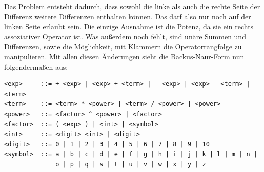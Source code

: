\documentclass[11pt]{article}
\begin{document}
Das Problem entsteht dadurch, dass sowohl die linke als auch 
die rechte Seite der Differenz weitere Differenzen enthalten können. 
Das darf also nur noch auf der linken Seite erlaubt sein. 
Die einzige Ausnahme ist die Potenz, da sie ein rechts assoziativer Operator ist. 
Was außerdem noch fehlt, sind unäre Summen und Differenzen, 
sowie die Möglichkeit, mit Klammern die Operatorrangfolge zu manipulieren. 
Mit allen diesen Änderungen sieht die Backus-Naur-Form nun folgendermaßen aus:

\begin{verbatim}
<exp>     ::= + <exp> | <exp> + <term> | - <exp> | <exp> - <term> | <term> 
<term>    ::= <term> * <power> | <term> / <power> | <power>
<power>   ::= <factor> ^ <power> | <factor>
<factor>  ::= ( <exp> ) | <int> | <symbol> 
<int>     ::= <digit> <int> | <digit>
<digit>   ::= 0 | 1 | 2 | 3 | 4 | 5 | 6 | 7 | 8 | 9 | 10
<symbol>  ::= a | b | c | d | e | f | g | h | i | j | k | l | m | n | 
              o | p | q | s | t | u | v | w | x | y | z
\end{verbatim}
\end{document}
